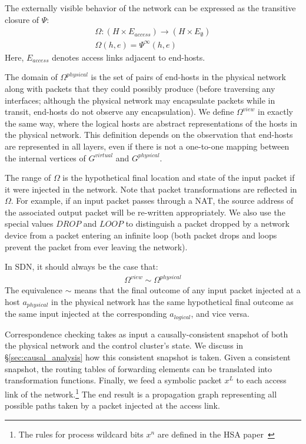 The externally visible behavior of the network can be expressed as the
transitive closure of $\Psi$:
\begin{align*}
\Omega: (H \times E_{access}) \rightarrow (H \times E_{\emptyset}) \\
\Omega(h,e) = \Psi^{\infty}(h,e)
\end{align*}
Here, $E_{access}$ denotes access links adjacent to end-hosts.

The domain of $\Omega^{physical}$ is the set of pairs of end-hosts in the
physical network along with packets that they could possibly produce (before
traversing any interfaces; although the physical network may encapsulate
packets while in transit, end-hosts do not observe any encapsulation).
We define $\Omega^{view}$ in exactly the same way, where
the logical hosts are abstract representations of the hosts in the physical
network. This definition depends on the observation that end-hosts are represented
in all layers, even if there is not a one-to-one mapping between the
internal vertices of $G^{virtual}$ and $G^{physical}$.

The range of $\Omega$ is the hypothetical final location and state of the
input packet if it were injected in the network.
Note that packet transformations are reflected in
$\Omega$. For example, if an input packet passes through a NAT,
the source address of the associated output packet will be re-written
appropriately. We also use the special values $DROP$ and $LOOP$ to distinguish
a packet dropped by a network device from a packet entering an
infinite loop (both packet drops and loops prevent the packet from ever leaving the network).

In SDN, it should always be the case that:
\begin{align*}
\Omega^{view} \sim \Omega^{physical}
\end{align*}
The equivalence $\sim$ means that the final outcome of any input packet
injected at a host $a_{physical}$ in the physical network has the same hypothetical final outcome as
the same input injected at the corresponding $a_{logical}$, and vice versa.

Correspondence checking takes as input a causally-consistent
snapshot of both the physical network and the
control cluster's state. We discuss in \S\ref{sec:causal_analysis} how this consistent snapshot
is taken. Given a consistent
snapshot, the routing
tables of forwarding elements can be translated into transformation functions.
Finally, we feed a symbolic packet $x^L$ to each access link of the
network.\footnote{The rules for process wildcard bits $x^n$ are defined in
the HSA paper~\cite{hsa}} The end result is a propagation graph representing all possible paths taken by a packet injected
at the access link.

